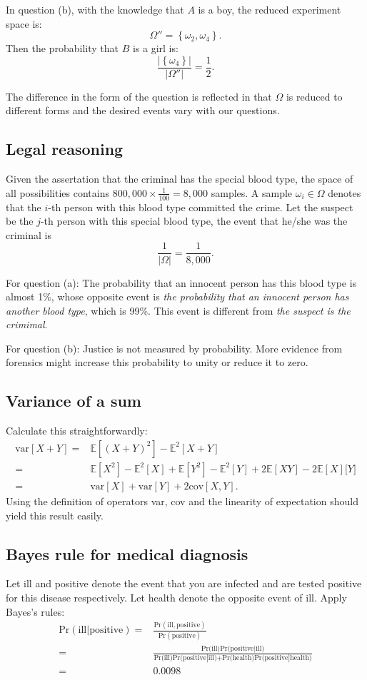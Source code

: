\documentclass[UTF8]{ctexart}
\begin{document}
In question (b), with the knowledge that $A$ is a boy, the reduced experiment space is:
$$\Omega''=\left\{\omega_{2},\omega_{4} \right\}.$$
Then the probability that $B$ is a girl is:
$$\frac{|\left\{\omega_{4} \right\}|}{|\Omega''|}=\frac{1}{2}.$$

The difference in the form of the question is reflected in that $\Omega$ is reduced to different forms and the desired events vary with our questions.

\subsection{Legal reasoning}
Given the assertation that the criminal has the special blood type, the space of all possibilities contains $800,000\times \frac{1}{100}=8,000$ samples.
A sample $\omega_{i}\in\Omega$ denotes that the $i$-th person with this blood type committed the crime.
Let the suspect be the $j$-th person with this special blood type, the event that he/she was the criminal is
$$\frac{1}{|\Omega|}=\frac{1}{8,000}.$$

For question (a): The probability that an innocent person has this blood type is almost 1\%, whose opposite event is \emph{the probability that an innocent person has another blood type}, which is 99\%.
This event is different from \emph{the suspect is the crimimal}.

For question (b): Justice is not measured by probability.
More evidence from forensics might increase this probability to unity or reduce it to zero.

\subsection{Variance of a sum}
Calculate this straightforwardly:
\begin{align}
\text{var}[X+Y]=&\mathbb{E}[(X+Y)^{2}]-\mathbb{E}^{2}[X+Y] \nonumber \\
=&\mathbb{E}[X^{2}]-\mathbb{E}^{2}[X]+\mathbb{E}[Y^{2}]-\mathbb{E}^{2}[Y]+2\mathbb{E}[XY]-2\mathbb{E}[X]\mathbb[Y] \nonumber \\
=&\text{var}[X]+\text{var}[Y]+2\text{cov}[X,Y].\nonumber
\end{align}
Using the definition of operators var, cov and the linearity of expectation should yield this result easily.

\subsection{Bayes rule for medical diagnosis}
Let ill and positive denote the event that you are infected and are tested positive for this disease respectively.
Let health denote the opposite event of ill.
Apply Bayes's rules:
\begin{align}
\text{Pr}(\text{ill}|\text{positive})=&\frac{\text{Pr}(\text{ill},\text{positive})}{\text{Pr}(\text{positive})}\nonumber \\
=&\frac{\text{Pr(ill)Pr(positive}|\text{ill)}}{\text{Pr(ill)Pr(positive}|\text{ill)+Pr(health)Pr(positive}|\text{health)}} \nonumber \\
=&0.0098 \nonumber
\end{align}
\end{document}
